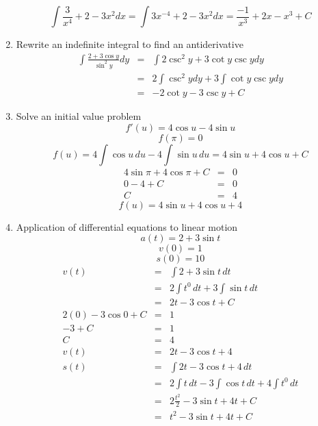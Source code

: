 \documentclass{article}
\begin{document}
\begin{enumerate}
            $$\int{\frac{3}{x^4} + 2 - 3x^2}dx = \int{3x^{-4} + 2 - 3x^2}dx = \frac{-1}{x^3} + 2x - x^3 + C$$
        \item Rewrite an indefinite integral to find an antiderivative
            \begin{eqnarray}
                \int{\frac{2 + 3\cos{y}}{\sin^2{y}}}dy &=& \int{2\csc^2{y} + 3\cot{y}\csc{y}}dy \\
                                                       &=& 2\int{\csc^2{y}}dy + 3\int{\cot{y}\csc{y}}dy \\
                                                       &=& -2\cot{y} - 3\csc{y} + C
            \end{eqnarray}
        \item Solve an initial value problem
            $$f'(u) = 4\cos{u} - 4\sin{u}$$
            $$f(\pi) = 0$$
            $$f(u) = 4\int{\cos{u}}\,du - 4\int{\sin{u}}\,du = 4\sin{u} + 4\cos{u} + C$$
            \begin{eqnarray}
                4\sin{\pi} + 4\cos{\pi} + C &=& 0 \\
                0 - 4 + C &=& 0 \\
                C &=& 4
            \end{eqnarray}
            $$f(u) = 4\sin{u} + 4\cos{u} + 4$$
        \item Application of differential equations to linear motion
            $$a(t) = 2 + 3\sin{t}$$
            $$v(0) = 1$$
            $$s(0) = 10$$
            \begin{eqnarray}
                v(t) &=& \int{2 + 3\sin{t}}\,dt \\
                     &=& 2\int{t^0}\,dt + 3\int{\sin{t}}\,dt \\
                     &=& 2t - 3\cos{t} + C \\
                2(0) - 3\cos{0} + C &=& 1 \\
                - 3 + C &=& 1 \\
                C &=& 4 \\
                v(t) &=& 2t - 3\cos{t} + 4 \\
                s(t) &=& \int{2t - 3\cos{t} + 4}\,dt \\
                     &=& 2\int{t}\,dt - 3\int{\cos{t}}\,dt + 4\int{t^0}\,dt \\
                     &=& 2\frac{t^2}{2} - 3\sin{t} + 4t + C \\
                     &=& t^2 - 3\sin{t} + 4t + C \\

\end{eqnarray}
\end{enumerate}
\end{document}
